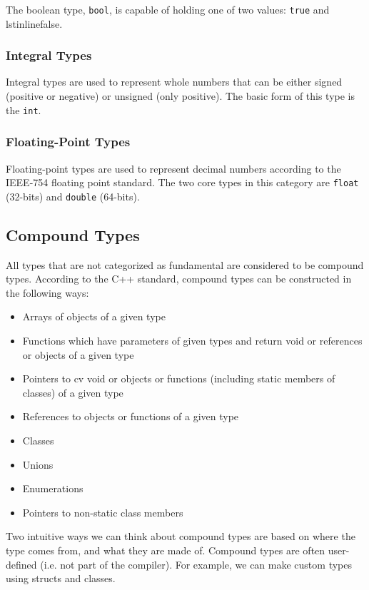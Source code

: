\documentclass[11pt,fancy,authoryear]{elegantbook}
\begin{document}
The boolean type, \lstinline{bool}, is capable of holding one of two values: \lstinline{true} and lstinline{false}.

\subsubsection{Integral Types}

Integral types are used to represent whole numbers that can be either signed (positive or negative) or unsigned (only positive). The basic form of this type is the \lstinline{int}.

\subsubsection{Floating-Point Types}

Floating-point types are used to represent decimal numbers according to the IEEE-754 floating point standard. The two core types in this category are \lstinline{float} (32-bits) and \lstinline{double} (64-bits).

\subsection{Compound Types}

All types that are not categorized as fundamental are considered to be compound types. According to the C++ standard, compound types can be constructed in the following ways:

\begin{itemize}
  \item Arrays of objects of a given type
  \item Functions which have parameters of given types and return void or references or objects of a given type
  \item Pointers to cv void or objects or functions (including static members of classes) of a given type
  \item References to objects or functions of a given type
  \item Classes
  \item Unions
  \item Enumerations
  \item Pointers to non-static class members
\end{itemize}

Two intuitive ways we can think about compound types are based on where the type comes from, and what they are made of. Compound types are often user-defined (i.e. not part of the compiler). For example, we can make custom types using structs and classes.
\end{document}
